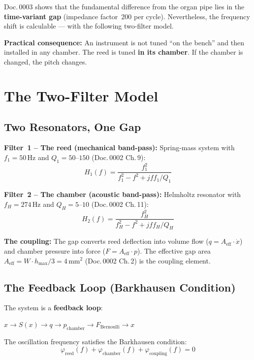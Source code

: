 \documentclass[11pt,a4paper]{article}
\begin{document}
Doc.\,0003 shows that the fundamental difference from the organ pipe lies in the \textbf{time-variant gap} (impedance factor~200 per cycle). Nevertheless, the frequency shift is calculable --- with the following two-filter model.

\begin{warnbox}
\textbf{Practical consequence:} An instrument is not tuned ``on the bench'' and then installed in any chamber. The reed is tuned \textbf{in its chamber}. If the chamber is changed, the pitch changes.
\end{warnbox}

\section{The Two-Filter Model}

\subsection{Two Resonators, One Gap}

\textbf{Filter~1 -- The reed (mechanical band-pass):} Spring-mass system with $f_1 = 50$\,Hz and $Q_1 = 50$--$150$ (Doc.\,0002 Ch.\,9):
\begin{equation}
H_1(f) = \frac{f_1^2}{f_1^2 - f^2 + j f f_1 / Q_1}
\end{equation}

\textbf{Filter~2 -- The chamber (acoustic band-pass):} Helmholtz resonator with $f_H = 274$\,Hz and $Q_H = 5$--$10$ (Doc.\,0002 Ch.\,11):
\begin{equation}
H_2(f) = \frac{f_H^2}{f_H^2 - f^2 + j f f_H / Q_H}
\end{equation}

\textbf{The coupling:} The gap converts reed deflection into volume flow ($q = A_\text{eff} \cdot \dot{x}$) and chamber pressure into force ($F = A_\text{eff} \cdot p$). The effective gap area $A_\text{eff} = W \cdot h_\text{max}/3 = 4$\,mm$^2$ (Doc.\,0002 Ch.\,2) is the coupling element.

\subsection{The Feedback Loop (Barkhausen Condition)}

The system is a \textbf{feedback loop}:

\medskip
\centerline{$x \to S(x) \to q \to p_\text{chamber} \to F_\text{Bernoulli} \to x$}
\medskip

The oscillation frequency satisfies the Barkhausen condition:
\begin{equation}
\varphi_\text{reed}(f) + \varphi_\text{chamber}(f) + \varphi_\text{coupling}(f) = 0
\end{equation}
\end{document}

